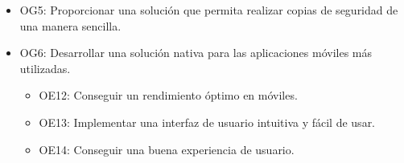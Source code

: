 \begin{itemize}
\begin{itemize}
        \end{itemize}
    \item OG5: Proporcionar una solución que permita realizar copias de seguridad de una manera sencilla.
    \item OG6: Desarrollar una solución nativa para las aplicaciones móviles más utilizadas.
        \begin{itemize}
            \item OE12: Conseguir un rendimiento óptimo en móviles.
            \item OE13: Implementar una interfaz de usuario intuitiva y fácil de usar.
            \item OE14: Conseguir una buena experiencia de usuario.
        \end{itemize}

\end{itemize}
